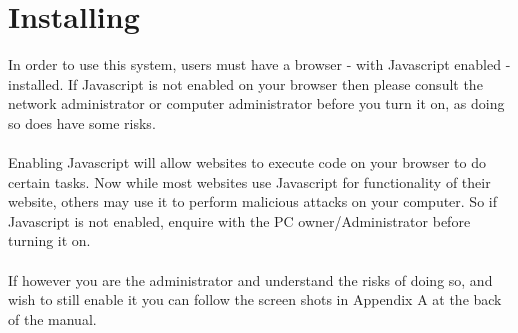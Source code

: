 \section{Installing}
\par{In order to use this system, users must have a browser - with Javascript enabled - installed. If Javascript is not enabled on your browser then please consult the network administrator or computer administrator before you turn it on, as doing so does have some risks. \\ \\Enabling Javascript will allow websites to execute code on your browser to do certain tasks. Now while most websites use Javascript for functionality of their website, others may use it to perform malicious attacks on your computer. So if Javascript is not enabled, enquire with the PC owner/Administrator before turning it on. \\ \\If however you are the administrator and understand the risks of doing so, and wish to still enable it you can follow the screen shots in Appendix A at the back of the manual.}
